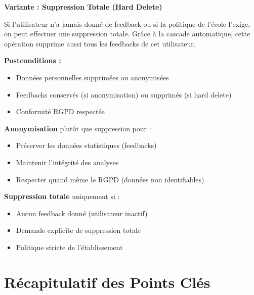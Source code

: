 \documentclass[11pt,a4paper]{article}
\begin{document}
\textbf{Variante : Suppression Totale (Hard Delete)}

Si l'utilisateur n'a jamais donné de feedback ou si la politique de l'école l'exige, on peut effectuer une suppression totale. Grâce à la cascade automatique, cette opération supprime aussi tous les feedbacks de cet utilisateur.

\textbf{Postconditions :}
\begin{itemize}
    \item Données personnelles supprimées ou anonymisées
    \item Feedbacks conservés (si anonymisation) ou supprimés (si hard delete)
    \item Conformité RGPD respectée
\end{itemize}

\begin{important}
\textbf{Anonymisation} plutôt que suppression pour :
\begin{itemize}
    \item Préserver les données statistiques (feedbacks)
    \item Maintenir l'intégrité des analyses
    \item Respecter quand même le RGPD (données non identifiables)
\end{itemize}

\textbf{Suppression totale} uniquement si :
\begin{itemize}
    \item Aucun feedback donné (utilisateur inactif)
    \item Demande explicite de suppression totale
    \item Politique stricte de l'établissement
\end{itemize}
\end{important}

\clearpage

\section{Récapitulatif des Points Clés}
\label{sec:conclusion}
\end{document}
